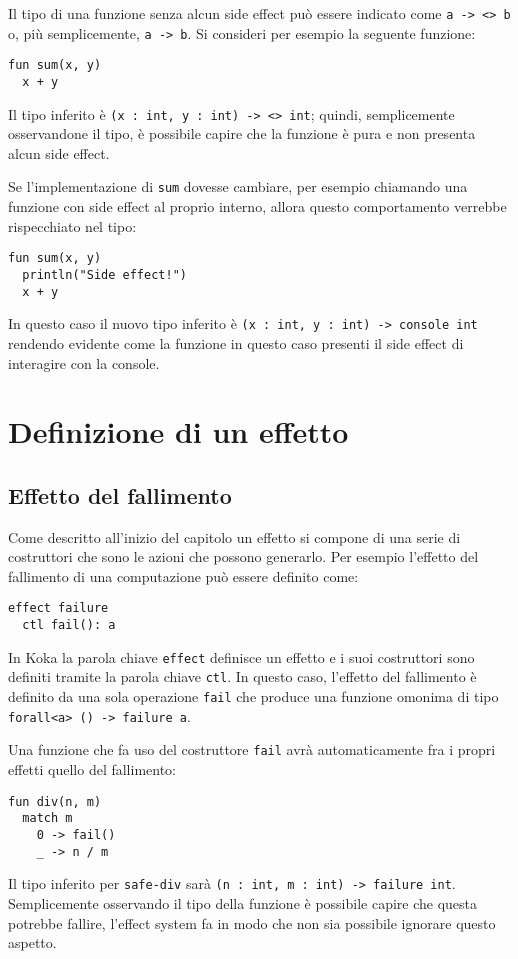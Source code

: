 Il tipo di una funzione senza alcun side effect può essere indicato come \lstinline{a -> <> b} o, più semplicemente, \lstinline{a -> b}.
Si consideri per esempio la seguente funzione:
\begin{lstlisting}[language=koka]
fun sum(x, y)
  x + y
\end{lstlisting}
Il tipo inferito è \lstinline{(x : int, y : int) -> <> int}; quindi, semplicemente osservandone il tipo, è possibile capire che la funzione è pura e non presenta alcun side effect.

Se l'implementazione di \lstinline{sum} dovesse cambiare, per esempio chiamando una funzione con side effect al proprio interno, allora questo comportamento verrebbe rispecchiato nel tipo:
\begin{lstlisting}[language=koka]
fun sum(x, y)
  println("Side effect!")
  x + y
\end{lstlisting}
In questo caso il nuovo tipo inferito è \lstinline{(x : int, y : int) -> console int} rendendo evidente come la funzione in questo caso presenti il side effect di interagire con la console.


\section{Definizione di un effetto}

\subsection{Effetto del fallimento}
Come descritto all'inizio del capitolo un effetto si compone di una serie di costruttori che sono le azioni che possono generarlo.
Per esempio l'effetto del fallimento di una computazione può essere definito come:
\begin{lstlisting}[language=koka]
effect failure
  ctl fail(): a
\end{lstlisting}

In Koka la parola chiave \lstinline{effect} definisce un effetto e i suoi costruttori sono definiti tramite la parola chiave \lstinline{ctl}.
In questo caso, l'effetto del fallimento è definito da una sola operazione \lstinline{fail} che produce una funzione omonima di tipo \lstinline{forall<a> () -> failure a}.

Una funzione che fa uso del costruttore \lstinline{fail} avrà automaticamente fra i propri effetti quello del fallimento:
\begin{lstlisting}[language=koka]
fun div(n, m)
  match m
    0 -> fail()
    _ -> n / m
\end{lstlisting}
Il tipo inferito per \lstinline{safe-div} sarà \lstinline{(n : int, m : int) -> failure int}. Semplicemente osservando il tipo della funzione è possibile capire che questa potrebbe fallire, l'effect system fa in modo che non sia possibile ignorare questo aspetto.

